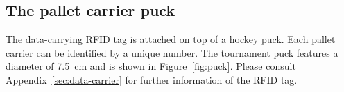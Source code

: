 \documentclass[12pt,twoside]{article}
\begin{document}




\subsection{The pallet carrier puck}
The data-carrying RFID tag is attached on top of a hockey puck. Each
pallet carrier can be identified by a unique number. The tournament puck
features a diameter of \SI{7.5}{\centi\metre} and is shown in
Figure~\ref{fig:puck}. Please consult Appendix~\ref{sec:data-carrier} for
further information of the RFID tag.
\end{document}
